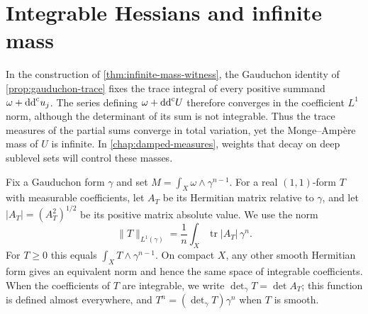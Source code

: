 \section{Integrable Hessians and infinite mass}
\label{sec:integrable-infinite-mass}

In the construction of \cref{thm:infinite-mass-witness}, the Gauduchon identity of \cref{prop:gauduchon-trace} fixes the trace integral of every positive summand $\omega+\mathrm{dd}^{\mathrm{c}} u_j$. The series defining $\omega+\mathrm{dd}^{\mathrm{c}} U$ therefore converges in the coefficient $L^1$ norm, although the determinant of its sum is not integrable. Thus the trace measures of the partial sums converge in total variation, yet the Monge--Amp\`ere mass of $U$ is infinite. In \cref{chap:damped-measures}, weights that decay on deep sublevel sets will control these masses.

Fix a Gauduchon form $\gamma$ and set $M=\int_X\omega\wedge\gamma^{n-1}$.
For a real $(1,1)$-form $T$ with measurable coefficients, let $A_T$ be its Hermitian matrix relative to $\gamma$, and let $|A_T|=(A_T^2)^{1/2}$ be its positive matrix absolute value. We use the norm
\[
 \|T\|_{L^1(\gamma)}
 =\frac1n\int_X\operatorname{tr}|A_T|\,\gamma^n.
\]
For $T\geq0$ this equals $\int_XT\wedge\gamma^{n-1}$. On compact $X$, any other smooth Hermitian form gives an equivalent norm and hence the same space of integrable coefficients. When the coefficients of $T$ are integrable, we write $\det_\gamma T=\det A_T$; this function is defined almost everywhere, and $T^n=(\det_\gamma T)\gamma^n$ when $T$ is smooth.

